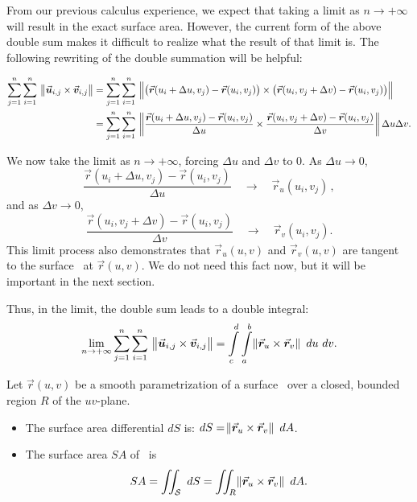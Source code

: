 From our previous calculus experience, we expect that taking a limit as $n\to +\infty$ will result in the exact surface area. However, the current form of the above double sum makes it difficult to realize what the result of that limit is. The following rewriting of the double summation will be helpful:

\begin{align*}
\sum_{j=1}^n\sum_{i=1}^n \ \norm{\vec u_{i,j}\times \vec v_{i,j}}&= \sum_{j=1}^n\sum_{i=1}^n \ \norm{\big(\vec r(u_i+\Delta u,v_j) - \vec r(u_i,v_j)\big) \times \big(\vec r(u_i,v_j+\Delta v)-\vec r(u_i,v_j)\big)} \\
&= \sum_{j=1}^n\sum_{i=1}^n \ \norm{\frac{\vec r(u_i+\Delta u,v_j) - \vec r(u_i,v_j)}{\Delta u} \times \frac{\vec r(u_i,v_j+\Delta v)-\vec r(u_i,v_j)}{\Delta v}}\Delta u\Delta v.
\end{align*}

We now take the limit as $n\to+\infty$, forcing $\Delta u$ and $\Delta v$ to 0. As $\Delta u\to 0$,
$$\frac{\vec r(u_i+\Delta u,v_j) - \vec r(u_i,v_j)}{\Delta u}\quad \to\quad \vec r_u(u_i,v_j)\,, $$
and as $\Delta v\to 0$,
$$\frac{\vec r(u_i,v_j+\Delta v)-\vec r(u_i,v_j)}{\Delta v}\quad \to\quad \vec r_v(u_i,v_j).$$
This limit process also demonstrates that $\vec r_u(u,v)$ and $\vec r_v(u,v)$ are tangent to the surface \surfaceS\ at $\vec r(u,v)$. We do not need this fact now, but it will be important in the next section.

Thus, in the limit, the double sum leads to a double integral:
$$\lim_{n\to+\infty} \sum_{j=1}^n\sum_{i=1}^n \ \norm{\vec u_{i,j}\times \vec v_{i,j}}= \int\limits_c^d\int\limits_a^b \norm{\vec r_u\times\vec r_v}\ du\ dv.$$

\begin{theorem}
\label{thm:par_surface_area}
Let $\vec r(u,v)$ be a smooth parametrization of a surface \surfaceS\ over a closed, bounded region $R$ of the $uv$-plane.
\begin{itemize}
\item	The surface area differential $dS$ is: $dS = \norm{\vec r_u\times \vec r_v}\ dA$.
\item The surface area $SA$ of \surfaceS\ is
$$SA = \iint_\surfaceS\ dS = \iint_R \norm{\vec r_u\times \vec r_v}\ dA.$$
\end{itemize}
\end{theorem}


